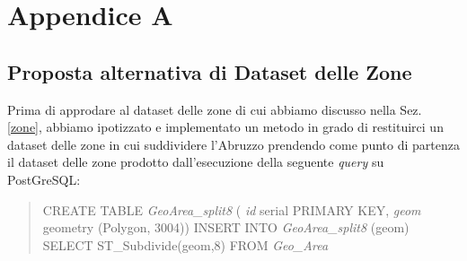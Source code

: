 \chapter{Appendice A}
\label{appendiceA}
\section{Proposta alternativa di Dataset delle Zone}
\label{nostraProposta}
Prima di approdare al dataset delle zone di cui abbiamo discusso nella Sez. \ref{zone}, abbiamo ipotizzato e implementato un metodo in grado di restituirci un dataset delle zone in cui suddividere l'Abruzzo prendendo come punto di partenza il dataset delle zone prodotto dall'esecuzione della seguente \textit{query} su PostGreSQL:
\begin{quote}
CREATE TABLE \textit{GeoArea\_split8} (
\newline
\textit{id} serial PRIMARY KEY,
\newline
\textit{geom} geometry (Polygon, 3004))
\newline
\newline
INSERT INTO \textit{GeoArea\_split8} (geom) 
\newline
SELECT ST\_Subdivide(geom,8)
\newline
FROM \textit{Geo\_Area}
\end{quote}

